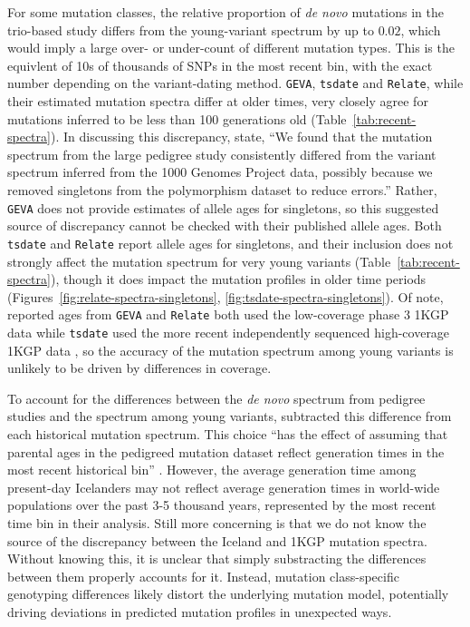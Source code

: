 \documentclass[]{article}
\newcommand{\krtcomment}[1]{{\textcolor{purple}{KRT: #1}}}
\newcommand{\GEVA}{\texttt{GEVA}\xspace}
\newcommand{\tsdate}{\texttt{tsdate}\xspace}
\newcommand{\relate}{\texttt{Relate}\xspace}
\begin{document}
For some mutation classes, the relative proportion of \emph{de novo} mutations
in the trio-based study differs from the young-variant spectrum by up to
$0.02$, which would imply a large over- or under-count of different mutation
types. This is the equivlent of 10s of thousands of SNPs in the most recent bin,
with the exact number depending on the variant-dating method.
\GEVA, \tsdate and \relate, while their estimated mutation spectra
differ at older times, very closely agree for mutations inferred to be less
than 100 generations old (Table~\ref{tab:recent-spectra}). In discussing this
discrepancy, \citet{wang2023human} state, ``We found that the mutation spectrum
from the large pedigree study consistently differed from the variant spectrum
inferred from the 1000 Genomes Project data, possibly because we removed
singletons from the polymorphism dataset to reduce errors.'' Rather, \GEVA does
not provide estimates of allele ages for singletons, so this suggested source
of discrepancy cannot be checked with their published allele ages. Both \tsdate
and \relate report allele ages for singletons, and their inclusion does not
strongly affect the mutation spectrum for very young variants
(Table~\ref{tab:recent-spectra}), though it does impact the mutation profiles
in older time periods (Figures~\ref{fig:relate-spectra-singletons},
\ref{fig:tsdate-spectra-singletons}). Of note, reported ages from \GEVA and
\relate both used the low-coverage phase 3 1KGP data while \tsdate used the
more recent independently sequenced high-coverage 1KGP data
\citep{byrska2022high}, so the accuracy of the mutation spectrum among young
variants is unlikely to be driven by differences in coverage.

To account for the differences between the \emph{de novo} spectrum from
pedigree studies \citep{jonsson2017parental} and the spectrum among young
variants, \citet{wang2023human} subtracted this difference from each historical
mutation spectrum. This choice ``has the effect of assuming that parental ages
in the pedigreed mutation dataset reflect generation times in the most recent
historical bin'' \citep{wang2023human}. However, the average generation time
among present-day Icelanders may not reflect average generation times in
world-wide populations over the past 3-5 thousand years, represented by the
most recent time bin in their analysis. Still more concerning is that we do not
know the source of the discrepancy between the Iceland and 1KGP mutation
spectra. Without knowing this, it is unclear that simply substracting the
differences between them properly accounts for it. Instead, mutation
class-specific genotyping differences likely distort the underlying mutation
model, potentially driving deviations in predicted mutation profiles in
unexpected ways.
\end{document}
